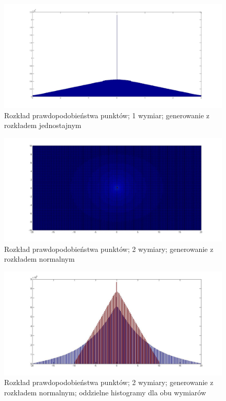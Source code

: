 \documentclass{mini}
\begin{document}
\begin{figure}[H]
\centering
\includegraphics[width=\textwidth]{ri_j_20M_1__3_3}
\caption{Rozkład prawdopodobieństwa punktów; 1 wymiar; generowanie z rozkładem jednostajnym}
\label{bladzenie:reinicjacja1dj}
\end{figure}

\begin{figure}[H]
\centering
\includegraphics[width=\textwidth]{ri_n_10M_2__20_20__10_10_4}
\caption{Rozkład prawdopodobieństwa punktów; 2 wymiary; generowanie z rozkładem normalnym}
\end{figure}

\begin{figure}[H]
\centering
\includegraphics[width=\textwidth]{ri_n_10M_2__20_20__10_10_4_1D}
\caption{Rozkład prawdopodobieństwa punktów; 2 wymiary; generowanie z rozkładem normalnym; oddzielne histogramy dla obu wymiarów}
\label{bladzenie:reinicjacja2ds}
\end{figure}
\end{document}
